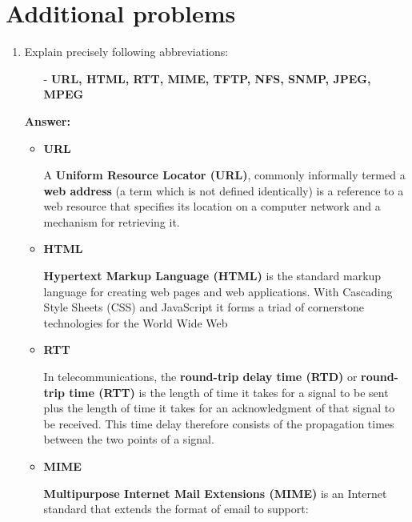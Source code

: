 
\section{Additional problems}

\begin{enumerate}
    \item Explain precisely following abbreviations:

    \begin{itemize}
        \item [-] \textbf{URL, HTML, RTT, MIME, TFTP, NFS, SNMP, JPEG, MPEG}
    \end{itemize}
    
    \textbf{Answer:}
    
    \begin{itemize}
        \item \textbf{URL}
        
        A \textbf{Uniform Resource Locator (URL)}, commonly informally termed a \textbf{web address} (a term which is not defined identically) is a reference to a web resource that specifies its location on a computer network and a mechanism for retrieving it.
        
        \item \textbf{HTML}
        
        \textbf{Hypertext Markup Language (HTML)} is the standard markup language for creating web pages and web applications. With Cascading Style Sheets (CSS) and JavaScript it forms a triad of cornerstone technologies for the World Wide Web
        
        \item \textbf{RTT}
        
        In telecommunications, the \textbf{round-trip delay time (RTD)} or \textbf{round-trip time (RTT)} is the length of time it takes for a signal to be sent plus the length of time it takes for an acknowledgment of that signal to be received. This time delay therefore consists of the propagation times between the two points of a signal.
        
        \item \textbf{MIME}
        
        \textbf{Multipurpose Internet Mail Extensions (MIME)} is an Internet standard that extends the format of email to support:
        

\end{itemize}
\end{enumerate}
